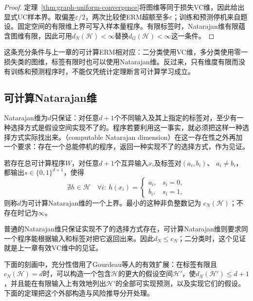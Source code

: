 \begin{proof}
定理~\ref{thm:graph-uniform-convergence}将图维等同于损失VC维，因此给出显式UC样本界。取偏差$\varepsilon/2$，两次比较使ERM超额至多$\varepsilon$；训练和预测停机来自题设。固定空间的有限维上界可写入样本量程序。有限标签时，Natarajan维有限蕴含图维有限，因此可用$d_N(\mathcal H)<\infty$替换$d_G(\mathcal H)<\infty$这一条件。
\end{proof}

这条充分条件与上一章的可计算ERM相对应：二分类使用VC维，多分类使用零一损失类的图维，标签有限时也可以使用Natarajan维。反过来，只有维度有限而没有训练和预测程序时，不能仅凭统计定理断言可计算学习成立。

\subsection{可计算Natarajan维}

Natarajan维为$d$只保证：对任意$d+1$个不同输入及其上指定的标签对，至少有一种选择方式是假设空间实现不了的。程序若要利用这一事实，就必须把这样一种选择方式实际找出来。（computable Natarajan dimension）在这一存在性之外再加一个要求：存在一个总能停机的程序，返回一种实现不了的选择方式，作为见证。

\begin{definition}[可计算Natarajan维]
\label{def:computable-natarajan-dimension}
若存在总可计算程序$W$，对任意$d+1$个互异输入$x_i$及标签对$(a_i,b_i)$、
$a_i\neq b_i$，都输出$s\in\{0,1\}^{d+1}$，使得
\[
 \nexists h\in\mathcal H\quad
 \forall i:\ h(x_i)=\begin{cases}a_i,&s_i=0,\\b_i,&s_i=1,\end{cases}
\]
则称$d$为可计算Natarajan维的一个上界。最小的这种非负整数记为
$c_N(\mathcal H)$；不存在时记为$\infty$。
\end{definition}

普通的Natarajan维只保证实现不了的选择方式存在，可计算Natarajan维则要求同一个程序能根据输入和标签对把它返回出来。因此$d_N\leq c_N$；二分类时，这个见证就是上一章有效VC维中的见证。

下面的刻画中，充分性借用了Gourdeau等人的有效扩展：在标签有限且$c_N(\mathcal H)=d$时，可以构造一个包含$\mathcal H$的更大的假设空间$\mathcal H'$，使$d_N(\mathcal H')\leq d+1$，并且能在有限输入上有效地列出$\mathcal H'$的全部可实现预测，以及实现它们的假设。下面的定理把这个外部构造与风险推导分开处理。

